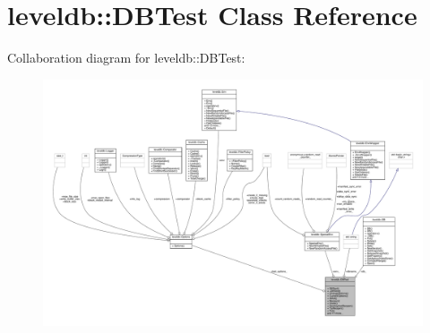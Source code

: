 \hypertarget{classleveldb_1_1_d_b_test}{}\section{leveldb\+::D\+B\+Test Class Reference}
\label{classleveldb_1_1_d_b_test}


Collaboration diagram for leveldb\+::D\+B\+Test\+:
\nopagebreak
\begin{figure}[H]
\begin{center}
\leavevmode
\includegraphics[width=350pt]{classleveldb_1_1_d_b_test__coll__graph}
\end{center}
\end{figure}
